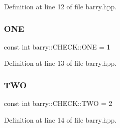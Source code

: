 Definition at line 12 of file barry.\+hpp.

\mbox{\label{namespacebarry_1_1_c_h_e_c_k_add50baad3a196b1979efbbf9e6c86913}} 
\subsubsection{\texorpdfstring{O\+NE}{ONE}}
{\footnotesize\ttfamily const int barry\+::\+C\+H\+E\+C\+K\+::\+O\+NE = 1}



Definition at line 13 of file barry.\+hpp.

\mbox{\label{namespacebarry_1_1_c_h_e_c_k_a6aa56c3d8a8260d90867278d21ace4d2}} 
\subsubsection{\texorpdfstring{T\+WO}{TWO}}
{\footnotesize\ttfamily const int barry\+::\+C\+H\+E\+C\+K\+::\+T\+WO = 2}



Definition at line 14 of file barry.\+hpp.


